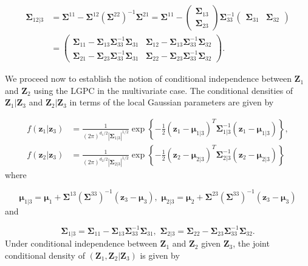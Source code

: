 \documentclass[
  12pt,
  letterpaper]{article}
\numberwithin{equation}{section}
\newcommand{\Z}{\bm{Z}}
\newcommand{\z}{\bm{z}}
\newcommand{\fmu}{\bm{\mu}}
\newcommand{\fSigma}{\bm{\Sigma}}
\begin{document}
\begin{align}
\fSigma_{12|3} &= \fSigma^{11} - \fSigma^{12}\left(\fSigma^{22}\right)^{-1}\fSigma^{21} = \fSigma^{11} - \begin{pmatrix} \fSigma_{13} \\ \fSigma_{23} \end{pmatrix} \fSigma_{33}^{-1} \begin{pmatrix} \fSigma_{31} & \fSigma_{32} \end{pmatrix}\nonumber \\
&= \begin{pmatrix} \fSigma_{11} - \fSigma_{13}\fSigma_{33}^{-1} \fSigma_{31} & \fSigma_{12} - \fSigma_{13}\fSigma_{33}^{-1} \fSigma_{32} \\ \fSigma_{21} - \fSigma_{23}\fSigma_{33}^{-1} \fSigma_{31} & \fSigma_{22} - \fSigma_{23}\fSigma_{33}^{-1} \fSigma_{32}\end{pmatrix}. 
\label{eq:blocksigma}
\end{align}

We proceed now to establish the notion of conditional independence between \(\Z_1\) and \(\Z_2\) using the LGPC in the multivariate case. The conditional densities of \(\Z_1|\Z_3\) and \(\Z_2|\Z_3\) in terms of the local Gaussian parameters are given by

\begin{align*}
f(\z_1 |\z_3) &= \frac{1}{(2\pi)^{d_1/2}|\fSigma_{1|3}|^{1/2}} \exp \left\{-\frac{1}{2}(\z_1 - \fmu_{1|3})^T\fSigma_{1|3}^{-1}(\z_1 - \fmu_{1|3})\right\}, \\
f(\z_2 |\z_3) &= \frac{1}{(2\pi)^{d_2/2}|\fSigma_{2|3}|^{1/2}} \exp \left\{-\frac{1}{2}(\z_2 - \fmu_{2|3})^T\fSigma_{2|3}^{-1}(\z_2 - \fmu_{2|3})\right\} 
\end{align*}
where

\begin{equation}
\fmu_{1|3} = \fmu_1 + \fSigma^{13}\left(\fSigma^{33}\right)^{-1}\left(\z_3 - \fmu_3\right), \,\, \fmu_{2|3} = \fmu_2 + \fSigma^{23}\left(\fSigma^{33}\right)^{-1}\left(\z_3 - \fmu_3\right)  
\end{equation}
and

\begin{equation}
\fSigma_{1|3} = \fSigma_{11}-\fSigma_{13}\fSigma_{33}^{-1}\fSigma_{31}, \,\, \fSigma_{2|3} = \fSigma_{22}-\fSigma_{23}\fSigma_{33}^{-1}\fSigma_{32}.
\label{eq:localsigma}
\end{equation}
Under conditional independence between \(\Z_1\) and \(\Z_2\) given \(\Z_3\), the joint conditional density of \((\Z_1, \Z_2|\Z_3)\) is given by
\end{document}
